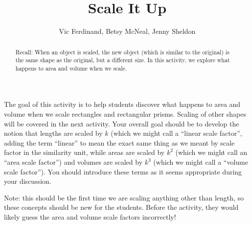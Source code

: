 \documentclass[nooutcomes]{ximera}
\title{Scale It Up}
\author{Vic Ferdinand, Betsy McNeal, Jenny Sheldon}
\begin{document}
\begin{abstract}
Recall: When an object is scaled, the new object (which is similar to the original) is the same shape as the original, but a different size.  In this activity, we explore what happens to area and volume when we scale.
\end{abstract}

\maketitle

\begin{instructorIntro}
The goal of this activity is to help students discover what happens to area and volume when we scale rectangles and rectangular prisms.  Scaling of other shapes will be covered in the next activity.  Your overall goal should be to develop the notion that lengths are scaled by $k$ (which we might call a ``linear scale factor'', adding the term ``linear'' to mean the exact same thing as we meant by scale factor in the similarity unit, while areas are scaled by $k^2$ (which we might call an ``area scale factor'') and volumes are scaled by $k^3$ (which we might call a ``volume scale factor'').  You should introduce these terms as it seems appropriate during your discussion.

Note: this should be the first time we are scaling anything other than length, so these concepts should be new for the students.  Before the activity, they would likely guess the area and volume scale factors incorrectly!
\end{instructorIntro}
\end{document}
